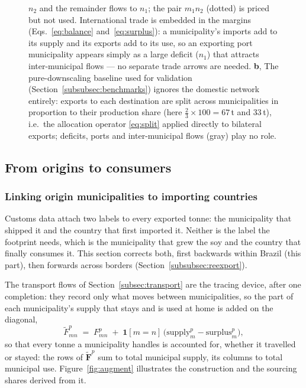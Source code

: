 \begin{figure}[htbp]
{$n_2$ and the remainder flows to $n_1$; the pair $m_1n_2$ (dotted) is priced
but not used. International trade is embedded in
the margins (Eqs.~\ref{eq:balance} and~\ref{eq:surplus}): a municipality's
imports add to its supply and its exports add to its use, so an exporting
port municipality appears simply as a large deficit ($n_1$) that attracts
inter-municipal flows --- no separate trade arrows are needed.
\textbf{b}, The pure-downscaling
baseline used for validation (Section~\ref{subsubsec:benchmarks}) ignores
the domestic network entirely: exports to each destination are split across
municipalities in proportion to their production share (here
$\tfrac{2}{3}\times100=67$\,t and $33$\,t), i.e.\ the allocation
operator \eqref{eq:split} applied directly to bilateral exports; deficits,
ports and inter-municipal flows (gray) play no role.}\label{fig:transport}
\end{figure}


\subsection{From origins to consumers}\label{subsec:origin2consumer}

\subsubsection{Linking origin municipalities to importing countries}\label{subsubsec:exportlink}
Customs data attach two labels to every exported tonne: the municipality
that shipped it and the country that first imported it. Neither is the label
the footprint needs, which is the municipality that grew the soy and the
country that finally consumes it. This section corrects both, first
backwards within Brazil (this part), then forwards across borders
(Section~\ref{subsubsec:reexport}).

The transport flows of Section~\ref{subsec:transport} are the tracing
device, after one completion: they record only what moves between
municipalities, so the part of each municipality's supply that stays and is
used at home is added on the diagonal,
\begin{equation}\label{eq:augment}
  \tilde F^p_{mn} \;=\; F^p_{mn} \;+\;
  \mathbf{1}[m=n]\,\big(\text{supply}^p_m-\text{surplus}^p_m\big),
\end{equation}
so that every tonne a municipality handles is accounted for, whether it
travelled or stayed: the rows of $\tilde{\mathbf{F}}^p$ sum to total
municipal supply, its columns to total municipal use.
Figure~\ref{fig:augment} illustrates the construction and the sourcing
shares derived from it.

